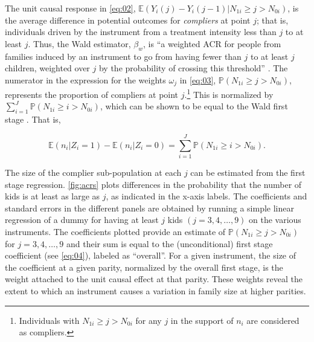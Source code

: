 The unit causal response in \eqref{eq:02}, $ \mathbb{E}(Y_{i}(j) - Y_{i}(j-1) | N_{1i} \geq j > N_{0i}) $, is the average difference in potential outcomes for \textit{compliers} at point $ j $; that is, individuals driven by the instrument from a treatment intensity less than $ j $ to at least $ j $. Thus, the Wald estimator, $ \beta_{w} $, is \enquote{a weighted ACR for people from families induced by an instrument to go from having fewer than $ j $ to at least $ j $ children, weighted over $ j $ by the probability of crossing this threshold} \parencite[p.~787]{angrist_multiple_2010}. The numerator in the expression for the weights $ \omega_{j} $ in \eqref{eq:03}, $ \mathbb{P}(N_{1i} \geq j > N_{0i}) $, represents the proportion of compliers at point $ j $.\footnote{Individuals with $ N_{1i} \geq j > N_{0i} $  for any $ j $ in the support of $ n_{i} $ are considered as compliers.} This is normalized by $ \sum_{i = 1}^{J} \mathbb{P}(N_{1i} \geq i > N_{0i}) $, which can be shown to be equal to the Wald first stage \parencite[see][p.~183]{Angrist2009}. That is,

\begin{equation}\label{eq:04}
\mathbb{E}(n_{i} | Z_{i} = 1) - \mathbb{E}(n_{i} | Z_{i} = 0) = \sum_{i = 1}^{J} \mathbb{P}(N_{1i} \geq i > N_{0i}).
\end{equation}

The size of the complier sub-population at each $ j $ can be estimated from the first stage regression. \autoref{fig:acrs} plots differences in the probability that the number of kids is at least as large as $ j $, as indicated in the x-axis labels. The coefficients and standard errors in the different panels are obtained by running a simple linear regression of a dummy for having at least $ j $ kids $ (j = 3, 4, \dots, 9) $ on the various instruments. The coefficients plotted provide an estimate of $ \mathbb{P}(N_{1i} \geq j > N_{0i}) $ for $ j = 3, 4, \dots, 9 $ and their sum is equal to the (unconditional) first stage coefficient (see \eqref{eq:04}), labeled as \enquote{overall}. For a given instrument, the size of the coefficient at a given parity, normalized by the overall first stage, is the weight attached to the unit causal effect at that parity. These weights reveal the extent to which an instrument causes a variation in family size at higher parities.  

